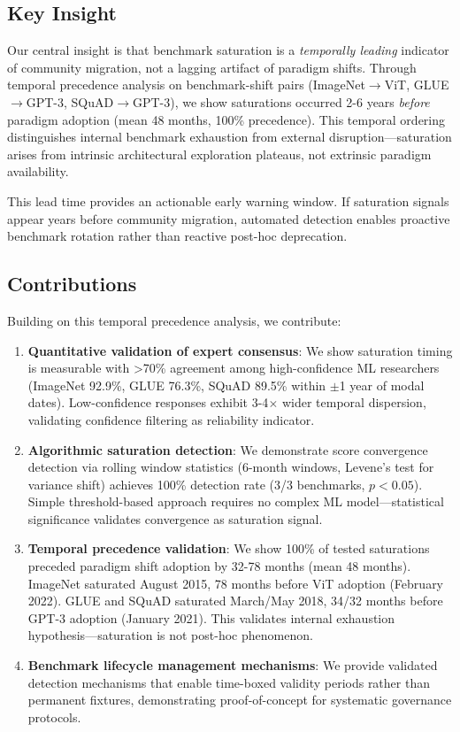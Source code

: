 \subsection{Key Insight}

Our central insight is that benchmark saturation is a \emph{temporally leading} indicator of community migration, not a lagging artifact of paradigm shifts. Through temporal precedence analysis on benchmark-shift pairs (ImageNet$\rightarrow$ViT, GLUE$\rightarrow$GPT-3, SQuAD$\rightarrow$GPT-3), we show saturations occurred 2-6 years \emph{before} paradigm adoption (mean 48 months, 100\% precedence). This temporal ordering distinguishes internal benchmark exhaustion from external disruption---saturation arises from intrinsic architectural exploration plateaus, not extrinsic paradigm availability.

This lead time provides an actionable early warning window. If saturation signals appear years before community migration, automated detection enables proactive benchmark rotation rather than reactive post-hoc deprecation.

\subsection{Contributions}

Building on this temporal precedence analysis, we contribute:

\begin{enumerate}
\item \textbf{Quantitative validation of expert consensus}: We show saturation timing is measurable with >70\% agreement among high-confidence ML researchers (ImageNet 92.9\%, GLUE 76.3\%, SQuAD 89.5\% within $\pm$1 year of modal dates). Low-confidence responses exhibit 3-4$\times$ wider temporal dispersion, validating confidence filtering as reliability indicator.

\item \textbf{Algorithmic saturation detection}: We demonstrate score convergence detection via rolling window statistics (6-month windows, Levene's test for variance shift) achieves 100\% detection rate (3/3 benchmarks, $p<0.05$). Simple threshold-based approach requires no complex ML model---statistical significance validates convergence as saturation signal.

\item \textbf{Temporal precedence validation}: We show 100\% of tested saturations preceded paradigm shift adoption by 32-78 months (mean 48 months). ImageNet saturated August 2015, 78 months before ViT adoption (February 2022). GLUE and SQuAD saturated March/May 2018, 34/32 months before GPT-3 adoption (January 2021). This validates internal exhaustion hypothesis---saturation is not post-hoc phenomenon.

\item \textbf{Benchmark lifecycle management mechanisms}: We provide validated detection mechanisms that enable time-boxed validity periods rather than permanent fixtures, demonstrating proof-of-concept for systematic governance protocols.
\end{enumerate}

